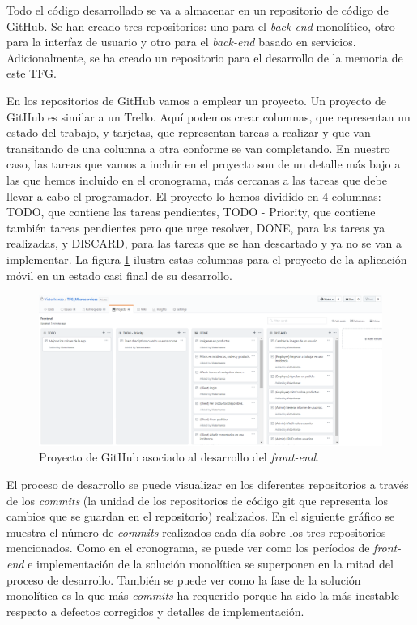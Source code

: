 \documentclass[11pt,spanish,listoffigures]{tfgetsinf}
\begin{document}
Todo el código desarrollado se va a almacenar en un repositorio de código de GitHub. Se han creado tres repositorios: uno para el \textit{back-end} monolítico, otro para la interfaz de usuario y otro para el \textit{back-end} basado en servicios. Adicionalmente, se ha creado un repositorio para el desarrollo de la memoria de este TFG.

En los repositorios de GitHub vamos a emplear un proyecto. Un proyecto de GitHub es similar a un Trello. Aquí podemos crear columnas, que representan un estado del trabajo, y tarjetas, que representan tareas a realizar y que van transitando de una columna a otra conforme se van completando. En nuestro caso, las tareas que vamos a incluir en el proyecto son de un detalle más bajo a las que hemos incluido en el cronograma, más cercanas a las tareas que debe llevar a cabo el programador. El proyecto lo hemos dividido en 4 columnas: TODO, que contiene las tareas pendientes, TODO - Priority, que contiene también tareas pendientes pero que urge resolver, DONE, para las tareas ya realizadas, y DISCARD, para las tareas que se han descartado y ya no se van a implementar. La figura \ref{fig:GitHubProject} ilustra estas columnas para el proyecto de la aplicación móvil en un estado casi final de su desarrollo.

\begin{figure}[h]
\centering
\includegraphics[scale=0.35]{GitHubProject}
\caption{Proyecto de GitHub asociado al desarrollo del \textit{front-end}.}
\label{fig:GitHubProject}
\end{figure}

\newpage


El proceso de desarrollo se puede visualizar en los diferentes repositorios a través de los \textit{commits} (la unidad de los repositorios de código git que representa los cambios que se guardan en el repositorio) realizados. En el siguiente gráfico se muestra el número de \textit{commits} realizados cada día sobre los tres repositorios mencionados. Como en el cronograma, se puede ver como los períodos de \textit{front-end} e implementación de la solución monolítica se superponen en la mitad del proceso de desarrollo. También se puede ver como la fase de la solución monolítica es la que más \textit{commits} ha requerido porque ha sido la más inestable respecto a defectos corregidos y detalles de implementación.
\end{document}
